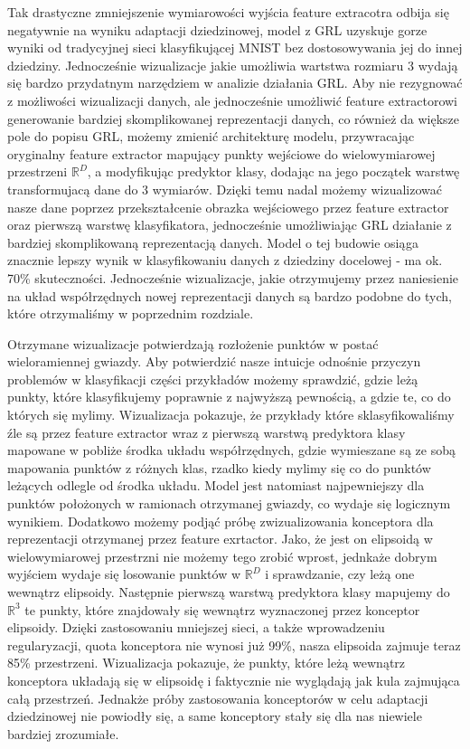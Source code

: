 \documentclass{article}
\begin{document}
Tak drastyczne zmniejszenie wymiarowości wyjścia feature extracotra odbija się negatywnie na wyniku adaptacji dziedzinowej, model z GRL uzyskuje gorze wyniki od tradycyjnej sieci klasyfikującej MNIST bez dostosowywania jej do innej dziedziny. Jednocześnie wizualizacje jakie umożliwia wartstwa rozmiaru 3 wydają się bardzo przydatnym narzędziem w analizie działania GRL. Aby nie rezygnować z możliwości wizualizacji danych, ale jednocześnie umożliwić feature extractorowi generowanie bardziej skomplikowanej reprezentacji danych, co również da większe pole do popisu GRL, możemy zmienić architekturę modelu, przywracając oryginalny feature extractor mapujący punkty wejściowe do wielowymiarowej przestrzeni $\mathbb{R}^{D}$, a modyfikując predyktor klasy, dodając na jego początek warstwę transformujacą dane do 3 wymiarów. Dzięki temu nadal możemy wizualizować nasze dane poprzez przekształcenie obrazka wejściowego przez feature extractor oraz pierwszą warstwę klasyfikatora, jednocześnie umożliwiając GRL działanie z bardziej skomplikowaną reprezentacją danych. Model o tej budowie osiąga znacznie lepszy wynik w klasyfikowaniu danych z dziedziny docelowej - ma ok. 70\% skuteczności. Jednocześnie wizualizacje, jakie otrzymujemy przez naniesienie na układ współrzędnych nowej reprezentacji danych są bardzo podobne do tych, które otrzymaliśmy w poprzednim rozdziale.
\par
Otrzymane wizualizacje potwierdzają rozłożenie punktów w postać wieloramiennej gwiazdy. Aby potwierdzić nasze intuicje odnośnie przyczyn problemów w klasyfikacji części przykładów możemy sprawdzić, gdzie leżą punkty, które klasyfikujemy poprawnie z najwyższą pewnością, a gdzie te, co do których się mylimy. Wizualizacja pokazuje, że przykłady które sklasyfikowaliśmy źle są przez feature extractor wraz z pierwszą warstwą predyktora klasy mapowane w pobliże środka układu współrzędnych, gdzie wymieszane są ze sobą mapowania punktów z różnych klas, rzadko kiedy mylimy się co do punktów leżących odlegle od środka układu. Model jest natomiast najpewniejszy dla punktów położonych w ramionach otrzymanej gwiazdy, co wydaje się logicznym wynikiem. Dodatkowo możemy podjąć próbę zwizualizowania konceptora dla reprezentacji otrzymanej przez feature exrtactor. Jako, że jest on elipsoidą w wielowymiarowej przestrzni nie możemy tego zrobić wprost, jednkaże dobrym wyjściem wydaje się losowanie punktów w $\mathbb{R}^{D}$ i sprawdzanie, czy leżą one wewnątrz elipsoidy. Następnie pierwszą warstwą predyktora klasy mapujemy do $\mathbb{R}^{3}$ te punkty, które znajdowały się wewnątrz wyznaczonej przez konceptor elipsoidy. Dzięki zastosowaniu mniejszej sieci, a także wprowadzeniu regularyzacji, quota konceptora nie wynosi już 99\%, nasza elipsoida zajmuje teraz 85\% przestrzeni. Wizualizacja pokazuje, że punkty, które leżą wewnątrz konceptora układają się w elipsoidę i faktycznie nie wyglądają jak kula zajmująca całą przestrzeń. Jednakże próby zastosowania konceptorów w celu adaptacji dziedzinowej nie powiodły się, a same konceptory stały się dla nas niewiele bardziej zrozumiałe.
\end{document}
